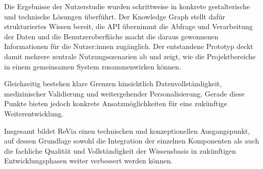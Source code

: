 Die Ergebnisse der Nutzerstudie wurden schrittweise in konkrete gestalterische und technische Lösungen überführt. Der Knowledge Graph stellt dafür strukturiertes Wissen bereit, die API übernimmt die Abfrage und Verarbeitung der Daten und die Benutzeroberfläche macht die daraus gewonnenen Informationen für die Nutzer:innen zugänglich. Der entstandene Prototyp deckt damit mehrere zentrale Nutzungsszenarien ab und zeigt, wie die Projektbereiche in einem gemeinsamen System zusammenwirken können.

Gleichzeitig bestehen klare Grenzen hinsichtlich Datenvollständigkeit, medizinischer Validierung und weitergehender Personalisierung. Gerade diese Punkte bieten jedoch konkrete Ansatzmöglichkeiten für eine zukünftige Weiterentwicklung.

Insgesamt bildet ReVia einen technischen und konzeptionellen Ausgangspunkt, auf dessen Grundlage sowohl die Integration der einzelnen Komponenten als auch die fachliche Qualität und Vollständigkeit der Wissensbasis in zukünftigen Entwicklungsphasen weiter verbessert werden können.
